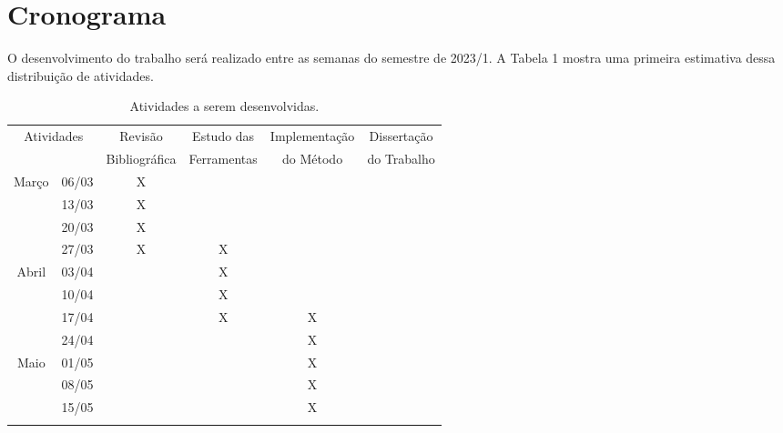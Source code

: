 \chapter{Cronograma}\label{cap:cronograma}

O desenvolvimento do trabalho será realizado entre as semanas do semestre
de 2023/1. A Tabela 1 mostra uma primeira estimativa dessa distribuição de atividades.

\begin{table}[h]
\caption{Atividades a serem desenvolvidas.}
\centering
\begin{tabular}{|cc|c|c|c|c|}
\hline
\multicolumn{2}{|c|}{Atividades} & Revisão       & Estudo das  & Implementação & Dissertação \\
\multicolumn{2}{|c|}{}           & Bibliográfica & Ferramentas & do Método     & do Trabalho \\ \hline
\multicolumn{1}{|c|}{\multirow{4}{*}{Março}}    & 06/03  & X &   &   &   \\ \cline{2-6}
\multicolumn{1}{|c|}{}                          & 13/03  & X &   &   &   \\ \cline{2-6}
\multicolumn{1}{|c|}{}                          & 20/03  & X &   &   &   \\ \cline{2-6}
\multicolumn{1}{|c|}{}                          & 27/03  & X & X &   &   \\ \hline
\multicolumn{1}{|c|}{\multirow{4}{*}{Abril}}    & 03/04  &   & X &   &   \\ \cline{2-6}
\multicolumn{1}{|c|}{}                          & 10/04  &   & X &   &   \\ \cline{2-6}
\multicolumn{1}{|c|}{}                          & 17/04  &   & X & X &   \\ \cline{2-6}
\multicolumn{1}{|c|}{}                          & 24/04  &   &   & X &   \\ \hline
\multicolumn{1}{|c|}{\multirow{5}{*}{Maio}}     & 01/05  &   &   & X &   \\ \cline{2-6}
\multicolumn{1}{|c|}{}                          & 08/05  &   &   & X &   \\ \cline{2-6}
\multicolumn{1}{|c|}{}                          & 15/05  &   &   & X &   \\ \cline{2-6}

\end{tabular}
\end{table}
